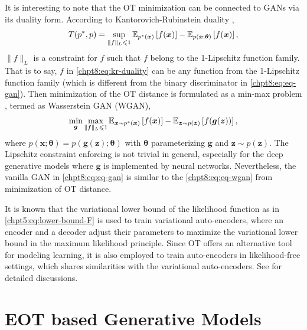 \begin{remark}\label{chpt8:rmk:wgan}
  It is interesting to note that the OT minimization can be connected to GANs via its duality form. According to Kantorovich-Rubinstein duality \cite[section~2.4]{2018arXiv180300567P}\cite{villani2008optimal},
  \begin{equation}\label{chpt8:eq:kr-duality}
     T(p^{\ast},p) = \sup_{\|f\|_{L} \leqslant 1} \mathbb{E}_{p^{\ast}(\bm{x})}\left[ f(\bm{x}) \right] -
  \mathbb{E}_{p(\bm{x};\bm{\theta})}\left[ f(\bm{x}) \right],
\end{equation}
$\|f\|_L$ is a constraint for $f$ such that $f$ belong to the 1-Lipschitz function
family. That is to say, $f$ in \eqref{chpt8:eq:kr-duality} can be any function from the 1-Lipschitz function
family (which is different from the binary discriminator in \eqref{chpt8:eq:eq-gan}). Then minimization of the OT distance is formulated as a min-max problem \cite{2017arXiv170107875A}, termed as Wasserstein GAN (WGAN),
\begin{equation}\label{chpt8:eq:eq-wgan}
  \min_{\bm{g}} \max_{\|f\|_{L} \leqslant 1} \mathbb{E}_{\bm{x} \sim p^{\ast}(\bm{x})}\left[ f(\bm{x}) \right] -
  \mathbb{E}_{\bm{z}\sim p(\bm{z})}\left[ f(\bm{g}(\bm{z})) \right],
\end{equation}
where $p(\bm{x};\bm{\theta}) = p(\bm{g}(\bm{z}); \bm{\theta})$ with $\bm{\theta}$ parameterizing $\bm{g}$ and $\bm{z}\sim p(\bm{z})$. The  Lipschitz constraint enforcing is not trivial in general, especially for the deep generative models where $\bm{g}$ is implemented by neural networks. Nevertheless, the vanilla GAN in \eqref{chpt8:eq:eq-gan} is similar to the \eqref{chpt8:eq:eq-wgan} from minimization of OT distance.
\end{remark}

\begin{remark}
It is known that the variational lower bound of the likelihood function as in \eqref{chpt5:eq:lower-bound-F} is used to train variational auto-encoders, where an encoder and a decoder adjust their parameters to maximize the variational lower bound in the maximum likelihood principle. Since OT offers an alternative tool for modeling learning, it is also employed to train auto-encoders in likelihood-free settings, which shares similarities with the variational auto-encoders. See \cite{patrini2018sinkhornVAE, genevay2017gan,bousquet2017optimal} for detailed discussions.
\end{remark}

\section{EOT based Generative Models}

